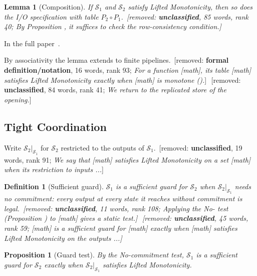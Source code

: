 \documentclass[sigconf]{cidr-2027}
\makeatletter
\newtheorem{proposition}{Proposition}
\newtheorem{lemma}{Lemma}
\newtheorem{definition}{Definition}
\theoremstyle{remark}
\newcommand{\commitment}{commitment\xspace}
\newcommand{\Spec}{\mathcal{S}}
\newcommand{\spectype}[1][]{I/O specification#1\xspace}
\newcommand{\proofinfull}{\par\pushQED{\qed}\normalfont\topsep2\p@\relax
  \trivlist\item[\@proofindent\hskip\labelsep{\@proofnamefont\proofname\@addpunct{.}}]%
  \ignorespaces In the full paper~\cite{hellerstein2026completecalmfull}.%
  \popQED\endtrivlist\@endpefalse}
\newcommand{\removednote}[1]{{\color{cutred}\footnotesize\,[removed: #1]\,}}
\makeatother
\begin{document}
\begin{lemma}[Composition]
\label{lem:composition}
If $\Spec_1$ and $\Spec_2$ satisfy Lifted Monotonicity, then so does the
\spectype with table $P_2\circ P_1$. \removednote{\textbf{unclassified}, 85 words, rank 40; \textit{By Proposition , it suffices to check the row-consistency condition.}}
\end{lemma}

\textcolor{newblue}{\proofinfull}

By associativity the lemma extends to finite pipelines. \removednote{\textbf{formal definition/notation}, 16 words, rank 93; \textit{For a function [math], its table [math] satisfies Lifted Monotonicity exactly when [math] is monotone ().}} \removednote{\textbf{unclassified}, 84 words, rank 41; \textit{We return to the replicated store of the opening.}}

\subsection{Tight Coordination}
\label{sec:tight-coordination}

Write $\Spec_2|_{\Spec_1}$ for $\Spec_2$ restricted to the outputs of
$\Spec_1$. \removednote{\textbf{unclassified}, 19 words, rank 91; \textit{We say that [math] satisfies Lifted Monotonicity on a set [math] when its restriction to inputs ...}}

\begin{definition}[Sufficient guard]
\label{def:sufficient-guard}
$\Spec_1$ is a \emph{sufficient guard} for $\Spec_2$ when
$\Spec_2|_{\Spec_1}$ needs no \commitment: every output at every state it
reaches without \commitment is legal. \removednote{\textbf{unclassified}, 11 words, rank 108; \textit{Applying the No- test (Proposition ) to [math] gives a static test.}} \removednote{\textbf{unclassified}, 45 words, rank 59; \textit{[math] is a sufficient guard for [math] exactly when [math] satisfies Lifted Monotonicity on the outputs ...}}
\end{definition}

\begin{proposition}[Guard test]
\label{prop:guard-test}
\textcolor{newblue}{By the No-\commitment test, $\Spec_1$ is a sufficient guard for $\Spec_2$
exactly when $\Spec_2|_{\Spec_1}$ satisfies Lifted Monotonicity.}
\end{proposition}
\end{document}

